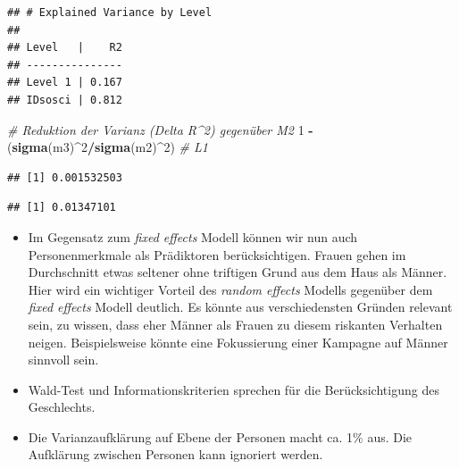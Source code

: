 \documentclass[
]{book}
\newenvironment{Shaded}{\begin{snugshade}}{\end{snugshade}}
\newcommand{\CommentTok}[1]{\textcolor[rgb]{0.56,0.35,0.01}{\textit{#1}}}
\newcommand{\DecValTok}[1]{\textcolor[rgb]{0.00,0.00,0.81}{#1}}
\newcommand{\KeywordTok}[1]{\textcolor[rgb]{0.13,0.29,0.53}{\textbf{#1}}}
\newcommand{\NormalTok}[1]{#1}
\newcommand{\OperatorTok}[1]{\textcolor[rgb]{0.81,0.36,0.00}{\textbf{#1}}}
\newcommand{\StringTok}[1]{\textcolor[rgb]{0.31,0.60,0.02}{#1}}
\providecommand{\tightlist}{%
  \setlength{\itemsep}{0pt}\setlength{\parskip}{0pt}}
\begin{document}
\begin{verbatim}
## # Explained Variance by Level
## 
## Level   |    R2
## ---------------
## Level 1 | 0.167
## IDsosci | 0.812
\end{verbatim}

\begin{Shaded}
\begin{Highlighting}[]
\CommentTok{# Reduktion der Varianz (Delta R^2) gegenüber M2}
\DecValTok{1} \OperatorTok{-}\StringTok{ }\NormalTok{(}\KeywordTok{sigma}\NormalTok{(m3)}\OperatorTok{^}\DecValTok{2}\OperatorTok{/}\KeywordTok{sigma}\NormalTok{(m2)}\OperatorTok{^}\DecValTok{2}\NormalTok{)  }\CommentTok{# L1}
\end{Highlighting}
\end{Shaded}

\begin{verbatim}
## [1] 0.001532503
\end{verbatim}

\begin{Shaded}
\end{Shaded}

\begin{verbatim}
## [1] 0.01347101
\end{verbatim}

\begin{itemize}
\tightlist
\item
  Im Gegensatz zum \emph{fixed effects} Modell können wir nun auch Personenmerkmale als Prädiktoren berücksichtigen. Frauen gehen im Durchschnitt etwas seltener ohne triftigen Grund aus dem Haus als Männer. Hier wird ein wichtiger Vorteil des \emph{random effects} Modells gegenüber dem \emph{fixed effects} Modell deutlich. Es könnte aus verschiedensten Gründen relevant sein, zu wissen, dass eher Männer als Frauen zu diesem riskanten Verhalten neigen. Beispielsweise könnte eine Fokussierung einer Kampagne auf Männer sinnvoll sein.
\item
  Wald-Test und Informationskriterien sprechen für die Berücksichtigung des Geschlechts.
\item
  Die Varianzaufklärung auf Ebene der Personen macht ca. 1\% aus. Die Aufklärung zwischen Personen kann ignoriert werden.
\end{itemize}
\end{document}
